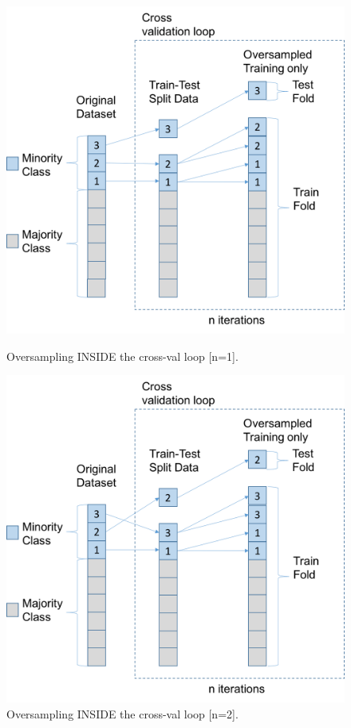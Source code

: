 \documentclass[12pt,a4paper,twoside]{report}
\begin{document}
\begin{figure}[H]
\centering
\includegraphics[scale=0.6]{oversample-after-1}
\caption{Oversampling INSIDE the cross-val loop [n=1].}
\label{fig:oversample-after-1}

\centering
\includegraphics[scale=0.6]{oversample-after-2}
\caption{Oversampling INSIDE the cross-val loop [n=2].}
\label{fig:oversample-after-2}
\end{figure}
\end{document}
